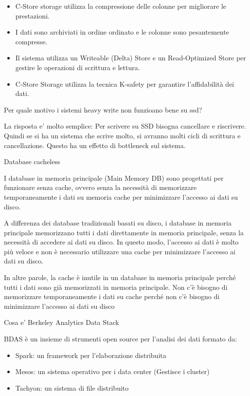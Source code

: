 \begin{itemize}
    \item C-Store storage utilizza la compressione delle colonne per migliorare le
          prestazioni.
    \item I dati sono archiviati in ordine ordinato e le colonne sono pesantemente
          compresse.
    \item Il sistema utilizza un Writeable (Delta) Store e un Read-Optimized Store per
          gestire le operazioni di scrittura e lettura.
    \item C-Store Storage utilizza la tecnica K-safety per garantire l'affidabilità dei
          dati.
\end{itemize}

\begin{domanda}
    Per quale motivo i sistemi heavy write non funzioano bene su ssd?
\end{domanda}

La risposta e' molto semplice: Per scrivere su SSD bisogna cancellare e
riscrivere. Quindi se si ha un sistema che scrive molto, si avranno molti cicli
di scrittura e cancellazione. Questo ha un effetto di bottleneck sul sistema.

\begin{domanda}
    Database cacheless
\end{domanda}

I database in memoria principale (Main Memory DB) sono progettati per
funzionare senza cache, ovvero senza la necessità di memorizzare
temporaneamente i dati su memoria cache per minimizzare l'accesso ai dati su
disco.

A differenza dei database tradizionali basati su disco, i database in memoria
principale memorizzano tutti i dati direttamente in memoria principale, senza
la necessità di accedere ai dati su disco. In questo modo, l'accesso ai dati è
molto più veloce e non è necessario utilizzare una cache per minimizzare
l'accesso ai dati su disco.

In altre parole, la cache è inutile in un database in memoria principale perché
tutti i dati sono già memorizzati in memoria principale. Non c'è bisogno di
memorizzare temporaneamente i dati su cache perché non c'è bisogno di
minimizzare l'accesso ai dati su disco

\begin{domanda}
    Cosa e' Berkeley Analytics Data Stack
\end{domanda}

BDAS è un insieme di strumenti open source per l'analisi dei dati formato da:
\begin{itemize}
    \item Spark: un framework per l'elaborazione distribuita
    \item Mesos: un sistema operativo per i data center (Gestisce i cluster)
    \item Tachyon: un sistema di file distribuito
\end{itemize}

